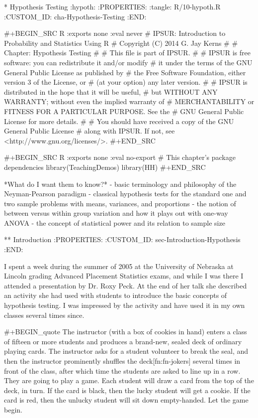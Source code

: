 * Hypothesis Testing                                                 :hypoth:
:PROPERTIES:
:tangle: R/10-hypoth.R
:CUSTOM_ID: cha-Hypothesis-Testing
:END:

#+BEGIN_SRC R :exports none :eval never
#    IPSUR: Introduction to Probability and Statistics Using R
#    Copyright (C) 2014  G. Jay Kerns
#
#    Chapter: Hypothesis Testing
#
#    This file is part of IPSUR.
#
#    IPSUR is free software: you can redistribute it and/or modify
#    it under the terms of the GNU General Public License as published by
#    the Free Software Foundation, either version 3 of the License, or
#    (at your option) any later version.
#
#    IPSUR is distributed in the hope that it will be useful,
#    but WITHOUT ANY WARRANTY; without even the implied warranty of
#    MERCHANTABILITY or FITNESS FOR A PARTICULAR PURPOSE.  See the
#    GNU General Public License for more details.
#
#    You should have received a copy of the GNU General Public License
#    along with IPSUR.  If not, see <http://www.gnu.org/licenses/>.
#+END_SRC

#+BEGIN_SRC R :exports none :eval no-export
# This chapter's package dependencies
library(TeachingDemos)
library(HH)
#+END_SRC

*What do I want them to know?*
- basic terminology and philosophy of the Neyman-Pearson paradigm
- classical hypothesis tests for the standard one and two sample
  problems with means, variances, and proportions
- the notion of between versus within group variation and how it plays
  out with one-way ANOVA
- the concept of statistical power and its relation to sample size

** Introduction
:PROPERTIES:
:CUSTOM_ID: sec-Introduction-Hypothesis
:END:

I spent a week during the summer of 2005 at the University of Nebraska
at Lincoln grading Advanced Placement Statistics exams, and while I
was there I attended a presentation by Dr. Roxy Peck. At the end of
her talk she described an activity she had used with students to
introduce the basic concepts of hypothesis testing. I was impressed by
the activity and have used it in my own classes several times since.

#+BEGIN_quote
The instructor (with a box of cookies in hand) enters a class of
fifteen or more students and produces a brand-new, sealed deck of
ordinary playing cards. The instructor asks for a student volunteer to
break the seal, and then the instructor prominently shuffles the
deck[fn:fn-jokers] several times in front of the class, after which
time the students are asked to line up in a row. They are going to
play a game. Each student will draw a card from the top of the deck,
in turn. If the card is black, then the lucky student will get a
cookie. If the card is red, then the unlucky student will sit down
empty-handed. Let the game begin.

